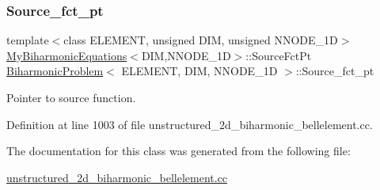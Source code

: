 \subsubsection{\texorpdfstring{Source\+\_\+fct\+\_\+pt}{Source\_fct\_pt}}
{\footnotesize\ttfamily template$<$class E\+L\+E\+M\+E\+NT, unsigned D\+IM, unsigned N\+N\+O\+D\+E\+\_\+1D$>$ \\
\hyperlink{classoomph_1_1MyBiharmonicEquations}{My\+Biharmonic\+Equations}$<$D\+IM,N\+N\+O\+D\+E\+\_\+1D$>$\+::Source\+Fct\+Pt \hyperlink{classBiharmonicProblem}{Biharmonic\+Problem}$<$ E\+L\+E\+M\+E\+NT, D\+IM, N\+N\+O\+D\+E\+\_\+1D $>$\+::Source\+\_\+fct\+\_\+pt\hspace{0.3cm}{\ttfamily [private]}}



Pointer to source function. 



Definition at line 1003 of file unstructured\+\_\+2d\+\_\+biharmonic\+\_\+bellelement.\+cc.



The documentation for this class was generated from the following file\+:\begin{DoxyCompactItemize}
\item 
\hyperlink{unstructured__2d__biharmonic__bellelement_8cc}{unstructured\+\_\+2d\+\_\+biharmonic\+\_\+bellelement.\+cc}\end{DoxyCompactItemize}
